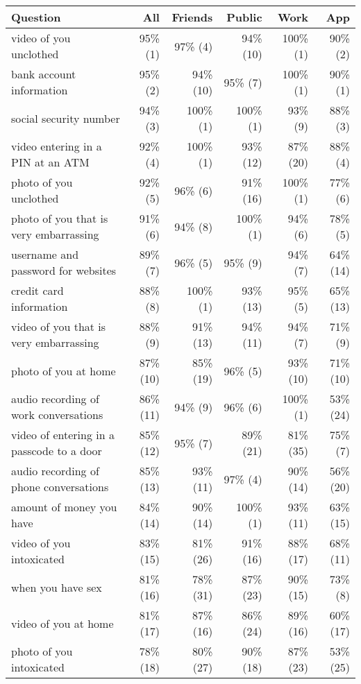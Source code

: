 \begin{table*}[t]
\begin{center}
\small
\begin{tabular}{| l | r | r | r | r | r |}
\hline
Question & All & Friends & Public & Work& App \\
\hline
video of you unclothed & 95\% (1) & 97\% (4) & 94\% (10) & 100\% (1) & 90\% (2) \\ 
bank account information & 95\% (2) & 94\% (10) & 95\% (7) & 100\% (1) & 90\% (1) \\ 
social security number & 94\% (3) & 100\% (1) & 100\% (1) & 93\% (9) & 88\% (3) \\ 
video entering in a PIN at an ATM & 92\% (4) & 100\% (1) & 93\% (12) & 87\% (20) & 88\% (4) \\ 
photo of you unclothed & 92\% (5) & 96\% (6) & 91\% (16) & 100\% (1) & 77\% (6) \\ 
photo of you that is very embarrassing & 91\% (6) & 94\% (8) & 100\% (1) & 94\% (6) & 78\% (5) \\ 
username and password for websites & 89\% (7) & 96\% (5) & 95\% (9) & 94\% (7) & 64\% (14) \\ 
credit card information & 88\% (8) & 100\% (1) & 93\% (13) & 95\% (5) & 65\% (13) \\ 
video of you that is very embarrassing & 88\% (9) & 91\% (13) & 94\% (11) & 94\% (7) & 71\% (9) \\ 
photo of you at home & 87\% (10) & 85\% (19) & 96\% (5) & 93\% (10) & 71\% (10) \\ 
audio recording of work conversations & 86\% (11) & 94\% (9) & 96\% (6) & 100\% (1) & 53\% (24) \\ 
video of entering in a passcode to a door & 85\% (12) & 95\% (7) & 89\% (21) & 81\% (35) & 75\% (7) \\ 
audio recording of phone conversations & 85\% (13) & 93\% (11) & 97\% (4) & 90\% (14) & 56\% (20) \\ 
amount of money you have & 84\% (14) & 90\% (14) & 100\% (1) & 93\% (11) & 63\% (15) \\ 
video of you intoxicated & 83\% (15) & 81\% (26) & 91\% (16) & 88\% (17) & 68\% (11) \\ 
when you have sex & 81\% (16) & 78\% (31) & 87\% (23) & 90\% (15) & 73\% (8) \\ 
video of you at home & 81\% (17) & 87\% (16) & 86\% (24) & 89\% (16) & 60\% (17) \\ 
photo of you intoxicated & 78\% (18) & 80\% (27) & 90\% (18) & 87\% (23) & 53\% (25) \\ 

\end{tabular}
\end{center}
\end{table*}
